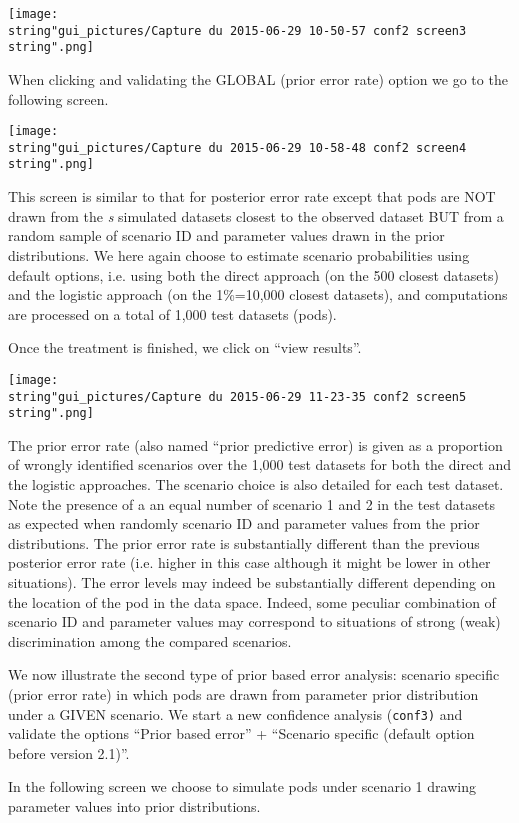 \texttt{[image: \\string"gui\_pictures/Capture du 2015-06-29 10-50-57 conf2 screen3\\string".png]}

When clicking and validating the GLOBAL (prior error rate) option
we go to the following screen.

\texttt{[image: \\string"gui\_pictures/Capture du 2015-06-29 10-58-48 conf2 screen4\\string".png]}

This screen is similar to that for posterior error rate except that
pods are NOT drawn from the \textit{s} simulated datasets closest
to the observed dataset BUT from a random sample of scenario ID and
parameter values drawn in the prior distributions. We here again choose
to estimate scenario probabilities using default options, i.e. using
both the direct approach (on the 500 closest datasets) and the logistic
approach (on the 1\%=10,000 closest datasets), and computations are
processed on a total of 1,000 test datasets (pods).

Once the treatment is finished, we click on ``view results''.

\texttt{[image: \\string"gui\_pictures/Capture du 2015-06-29 11-23-35 conf2 screen5\\string".png]}

The prior error rate (also named ``prior predictive error) is given
as a proportion of wrongly identified scenarios over the 1,000 test
datasets for both the direct and the logistic approaches. The scenario
choice is also detailed for each test dataset. Note the presence of
a an equal number of scenario 1 and 2 in the test datasets as expected
when randomly scenario ID and parameter values from the prior distributions.
The prior error rate is substantially different than the previous
posterior error rate (i.e. higher in this case although it might be
lower in other situations). The error levels may indeed be substantially
different depending on the location of the pod in the data space.
Indeed, some peculiar combination of scenario ID and parameter values
may correspond to situations of strong (weak) discrimination among
the compared scenarios.

We now illustrate the second type of prior based error analysis: scenario
specific (prior error rate) in which pods are drawn from parameter
prior distribution under a GIVEN scenario. We start a new confidence
analysis (\texttt{conf3)} and validate the options ``Prior based
error'' + ``Scenario specific (default option before version 2.1)''.

In the following screen we choose to simulate pods under scenario
1 drawing parameter values into prior distributions.

